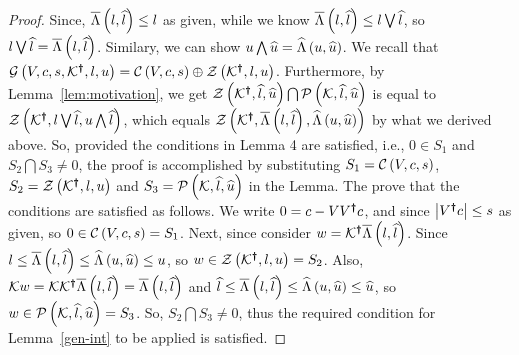 \begin{proof}
  Since, $\overline{\Lambda}\left(l,\widehat{l}\right)\leq l$ as given, while we know
  $\overline{\Lambda}\left(l,\widehat{l}\right)\leq l\bigvee\widehat{{l}}$, so
  $l\bigvee\widehat{l}=\overline{\Lambda}\left(l,\widehat{l}\right)$. Similary, we can show
  $u\bigwedge \widehat{u}=\widehat{\Lambda}\left(u,\widehat{u}\right)$.  We recall that
  $\mathcal{G}\left(V,c,s,\mathcal{K}^{\bm{\dagger}},l,u\right)=\mathcal{C}\left(V,c,s\right)\oplus\mathcal{Z}\left(\mathcal{K}^{\bm{\dagger}},l,u\right)$.
  Furthermore, by Lemma~\ref{lem:motivation}, we get
  $\mathcal{Z}\left(\mathcal{K}^{\bm{\dagger}},\widehat{l},\widehat{u}\right)\bigcap\mathcal{P}\left(\mathcal{K},\widehat{l},\widehat{u}\right)$
  is equal to
  $\mathcal{Z}\left(\mathcal{K}^{\bm{\dagger}},l\bigvee\widehat{l},u\bigwedge{\widehat{l}}\right)$, which
  equals
  $\mathcal{Z}\left(\mathcal{K}^{\bm{\dagger}},\overline{\Lambda}\left(l,\widehat{l}\right),\widehat{\Lambda}\left(u,\widehat{u}\right)\right)$
  by what we derived above.  So, provided the conditions in Lemma 4
  are satisfied, i.e., $0\in S_1$ and $S_2\bigcap S_3\neq 0$, the
  proof is accomplished by substituting $S_1=\mathcal{C}\left(V,c,s\right)$,
  $S_2=\mathcal{Z}\left(\mathcal{K}^{\bm{\dagger}},l,u\right)$ and
  $S_3=\mathcal{P}\left(\mathcal{K},\widehat{l},\widehat{u}\right)$ in the Lemma.  The prove
  that the conditions are satisfied as follows.  We write $0
  = c-VV^{\bm{\dagger}}c$, and since $\left|V^{\bm{\dagger}}c\right|\leq s$ as given, so
  $0\in \mathcal{C}\left(V,c,s\right)=S_1$.  Next, since consider
  $w=\mathcal{K}^{\bm{\dagger}}\overline{\Lambda}\left(l,\widehat{l}\right)$.  Since $l\leq
  \overline{\Lambda}\left(l,\widehat{l}\right)\leq \widehat{\Lambda}\left(u,\widehat{u}\right)\leq u$, so
  $w\in\mathcal{Z}\left(\mathcal{K}^{\bm{\dagger}},l,u\right)= S_2$.  Also, $\mathcal{K}
  w=\mathcal{K}\mathcal{K}^{\bm{\dagger}}\overline{\Lambda}\left(l,\widehat{l}\right) =
  \overline{\Lambda}\left(l,\widehat{l}\right)$ and $\widehat{l}\leq \overline{\Lambda}\left(l,\widehat{l}\right)\leq
  \widehat{\Lambda}\left(u,\widehat{u}\right)\leq \widehat{u}$, so $w\in
  \mathcal{P}\left(\mathcal{K},\widehat{l},\widehat{u}\right)=S_3$.  So, $S_2\bigcap S_3\neq
  0$, thus the required condition for Lemma~\ref{gen-int} to be
  applied is satisfied.
\end{proof}
%
